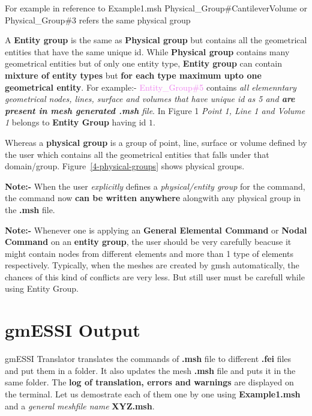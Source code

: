 \documentclass[11pt]{article}
\begin{document}
\begin{itemize}
\begin{itemize}
  \end{itemize}

  For          example          in          reference        to    {Example1.msh
  Physical\_Group\#CantileverVolume   or   Physical\_Group\#3   refers  the  same
  physical group}
 
  A  \textbf{Entity  group}  is the same as \textbf{Physical group} but
  contains  all  the  geometrical  entities  that  have  the same unique id. While
  \textbf{Physical  group}  contains  many  geometrical  entities  but of only one
  entity  type, \textbf{Entity group} can contain \textbf{mixture of entity types}
  but  \textbf{for  each  type maximum upto one geometrical entity}. For example:-
  \textcolor{violet}{Entity\_Group\#5}     contains     \textit{all    elemenntary
  geometrical  nodes,  lines,  surface  and  volumes  that have unique id as 5 and
  \textbf{are  present in mesh generated .msh} file}. In Figure 1 \textit{Point 1,
  Line 1 and Volume 1} belongs to \textbf{Entity Group} having id $1$.

  Whereas a \textbf{physical group} is a group of point, line, surface or
  volume defined by the user which contains all the geometrical entities that
  falls under that domain/group. Figure~\ref{4-physical-groups} shows physical groups.

  \textbf{Note:- } When the user \textit{explicitly} defines a
  \textit{physical/entity group} for the command, the command now \textbf{can
  be written anywhere} alongwith any physical group in the \textbf{.msh}
  file.

  \textbf{Note:- } Whenever one is applying an \textbf{General Elemental
  Command} or \textbf{Nodal Command} on an \textbf{entity group}, the user should be
  very carefully beacuse it might contain nodes from different elements and
  more than 1 type of elements respectively. Typically, when the meshes are
  created by gmsh automatically, the chances of this kind of conflicts are
  very less. But still user must be carefull while using Entity Group.

\end {itemize}

\section{gmESSI Output}

gmESSI Translator translates the commands of \textbf{.msh} file to different
\textbf{.fei} files and put them in a folder. It also updates the mesh
\textbf{.msh} file and puts it in the same folder. The \textbf{log of
translation, errors and warnings} are displayed on the terminal. Let us
demostrate each of them one by one using \textbf{Example1.msh}  and a
\textit{general meshfile name} \textbf{XYZ.msh}.
\end{document}
